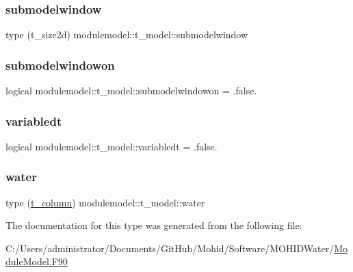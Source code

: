 \subsubsection{\texorpdfstring{submodelwindow}{submodelwindow}}
{\footnotesize\ttfamily type (t\+\_\+size2d) modulemodel\+::t\+\_\+model\+::submodelwindow\hspace{0.3cm}{\ttfamily [private]}}

\mbox{\label{structmodulemodel_1_1t__model_ab741279a37ae895ad6bcca72c9679935}} 
\subsubsection{\texorpdfstring{submodelwindowon}{submodelwindowon}}
{\footnotesize\ttfamily logical modulemodel\+::t\+\_\+model\+::submodelwindowon = .false.\hspace{0.3cm}{\ttfamily [private]}}

\mbox{\label{structmodulemodel_1_1t__model_a3a000261c5ac1d20133ba98bf28a4df7}} 
\subsubsection{\texorpdfstring{variabledt}{variabledt}}
{\footnotesize\ttfamily logical modulemodel\+::t\+\_\+model\+::variabledt = .false.\hspace{0.3cm}{\ttfamily [private]}}

\mbox{\label{structmodulemodel_1_1t__model_a59d87987e7ffbeb5b46799cb162e0e80}} 
\subsubsection{\texorpdfstring{water}{water}}
{\footnotesize\ttfamily type (\mbox{\hyperlink{structmodulemodel_1_1t__column}{t\+\_\+column}}) modulemodel\+::t\+\_\+model\+::water\hspace{0.3cm}{\ttfamily [private]}}



The documentation for this type was generated from the following file\+:\begin{DoxyCompactItemize}
\item 
C\+:/\+Users/administrator/\+Documents/\+Git\+Hub/\+Mohid/\+Software/\+M\+O\+H\+I\+D\+Water/\mbox{\hyperlink{_module_model_8_f90}{Module\+Model.\+F90}}\end{DoxyCompactItemize}
